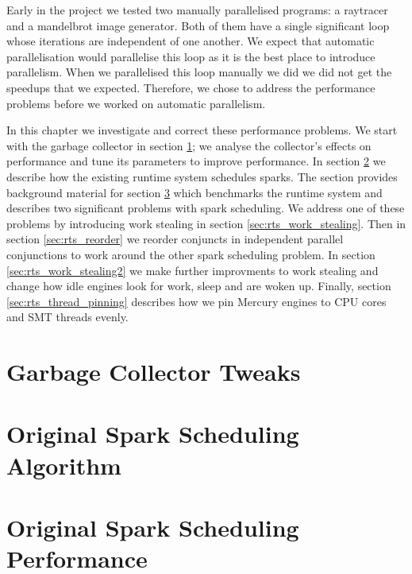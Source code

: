 

Early in the project
we tested two manually parallelised programs:
a raytracer and a mandelbrot image generator.
Both of them have a single significant loop
whose iterations are independent of one another.
We expect that automatic parallelisation would parallelise this loop
as it is the best place to introduce parallelism.
When we parallelised this loop manually we did
we did not get the speedups that we expected.
Therefore,
we chose to address the performance problems
before we worked on automatic parallelism.

In this chapter we investigate and correct these performance problems.
We start with the garbage collector in section \ref{sec:gc};
we analyse the collector's effects on performance and tune its parameters
to improve performance.
In section \ref{sec:original_scheduling} we describe how the existing runtime
system schedules sparks.
The section provides background material for section
\ref{sec:original_scheduling_performance}
which benchmarks the runtime system and describes two significant problems with
spark scheduling.
We address one of these problems by introducing work stealing in section
\ref{sec:rts_work_stealing}.
Then in section \ref{sec:rts_reorder} we reorder conjuncts in independent
parallel conjunctions to work around the other spark scheduling problem.
In section \ref{sec:rts_work_stealing2} we make further improvments to
work stealing and change how idle engines look for work, sleep and are
woken up.
Finally, section \ref{sec:rts_thread_pinning} describes how we pin Mercury
engines to CPU cores and SMT threads evenly.

\section{Garbage Collector Tweaks}
\label{sec:gc}



\section{Original Spark Scheduling Algorithm}
\label{sec:original_scheduling}



\section{Original Spark Scheduling Performance}
\label{sec:original_scheduling_performance}

